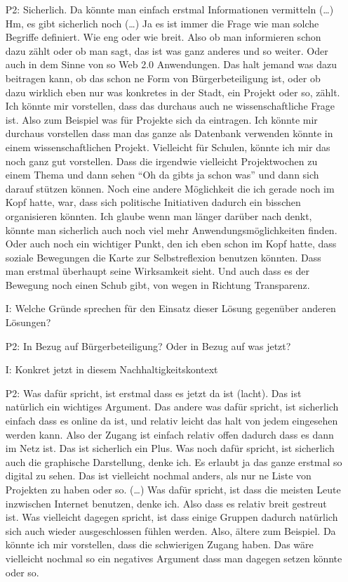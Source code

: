 \begin{itemize}
    \item[P2:] Sicherlich. Da k{\"o}nnte man einfach erstmal Informationen vermitteln (\dots) Hm, es gibt sicherlich noch (\dots) Ja es ist immer die Frage wie man solche Begriffe definiert. Wie eng oder wie breit. Also ob man informieren schon dazu z{\"a}hlt oder ob man sagt, das ist was ganz anderes und so weiter. Oder auch in dem Sinne von so Web 2.0 Anwendungen. Das halt jemand was dazu beitragen kann, ob das schon ne Form von B{\"u}rgerbeteiligung ist, oder ob dazu wirklich eben nur was konkretes in der Stadt, ein Projekt oder so, z{\"a}hlt. Ich k{\"o}nnte mir vorstellen, dass das durchaus auch ne wissenschaftliche Frage ist. Also zum Beispiel was f{\"u}r Projekte sich da eintragen. Ich k{\"o}nnte mir durchaus vorstellen dass man das ganze als Datenbank verwenden k{\"o}nnte in einem wissenschaftlichen Projekt. Vielleicht f{\"u}r Schulen, k{\"o}nnte ich mir das noch ganz gut vorstellen. Dass die irgendwie vielleicht Projektwochen zu einem Thema und dann sehen "`Oh da gibts ja schon was"' und dann sich darauf st{\"u}tzen k{\"o}nnen. Noch eine andere M{\"o}glichkeit die ich gerade noch im Kopf hatte, war, dass sich politische Initiativen dadurch ein bisschen organisieren k{\"o}nnten. Ich glaube wenn man l{\"a}nger dar{\"u}ber nach denkt, k{\"o}nnte man sicherlich auch noch viel mehr Anwendungsm{\"o}glichkeiten finden. Oder auch noch ein wichtiger Punkt, den ich eben schon im Kopf hatte, dass soziale Bewegungen die Karte zur Selbstreflexion benutzen k{\"o}nnten. Dass man erstmal {\"u}berhaupt seine Wirksamkeit sieht. Und auch dass es der Bewegung noch einen Schub gibt, von wegen in Richtung Transparenz.
    \item[I:] Welche Gr{\"u}nde sprechen f{\"u}r den Einsatz dieser L{\"o}sung gegen{\"u}ber anderen L{\"o}sungen?
    \item[P2:] In Bezug auf B{\"u}rgerbeteiligung? Oder in Bezug auf was jetzt?
    \item[I:] Konkret jetzt in diesem Nachhaltigkeitskontext
    \item[P2:] Was daf{\"u}r spricht, ist erstmal dass es jetzt da ist (lacht). Das ist nat{\"u}rlich ein wichtiges Argument. Das andere was daf{\"u}r spricht, ist sicherlich einfach dass es online da ist, und relativ leicht das halt von jedem eingesehen werden kann. Also der Zugang ist einfach relativ offen dadurch dass es dann im Netz ist. Das ist sicherlich ein Plus. Was noch daf{\"u}r spricht, ist sicherlich auch die graphische Darstellung, denke ich. Es erlaubt ja das ganze erstmal so digital zu sehen. Das ist vielleicht nochmal anders, als nur ne Liste von Projekten zu haben oder so. (\dots) Was daf{\"u}r spricht, ist dass die meisten Leute inzwischen Internet benutzen, denke ich. Also dass es relativ breit gestreut ist. Was vielleicht dagegen spricht, ist dass einige Gruppen dadurch nat{\"u}rlich sich auch wieder ausgeschlossen f{\"u}hlen werden. Also, {\"a}ltere zum Beispiel. Da k{\"o}nnte ich mir vorstellen, dass die schwierigen Zugang haben. Das w{\"a}re vielleicht nochmal so ein negatives Argument dass man dagegen setzen k{\"o}nnte oder so.

\end{itemize}
